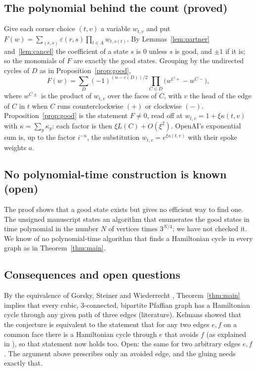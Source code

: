\documentclass[10pt]{amsart}
\numberwithin{equation}{section}
\theoremstyle{definition}
\theoremstyle{remark}
\newcommand{\eps}{\varepsilon}
\begin{document}
\subsection*{The polynomial behind the count (proved)}
Give each corner choice $(t,v)$ a variable $w_{t,v}$ and put $F(w)=\sum_{(r,s)}\eps(r,s)\prod_{t\in A}w_{t,s(t)}$.
By Lemmas~\ref{lem:partner} and~\ref{lem:cancel} the coefficient of a state $s$ is $0$ unless $s$ is good, and $\pm1$ if it is; so the monomials of $F$ are exactly the good states.
Grouping by the undirected cycles of $D$ as in Proposition~\ref{prop:good},
\[
F(w)=\sum_{D}(-1)^{(n-c(D))/2}\prod_{C\in D}\bigl(w^{C+}-w^{C-}\bigr),
\]
where $w^{C\pm}$ is the product of $w_{t,v}$ over the faces of $C$, with $v$ the head of the edge of $C$ in $t$ when $C$ runs counterclockwise $(+)$ or clockwise $(-)$.
Proposition~\ref{prop:good} is the statement $F\neq0$, read off at $w_{t,v}=1+\xi\kappa(t,v)$ with $\kappa=\sum_y\kappa_y$: each factor is then $\xi L(C)+O(\xi^2)$.
OpenAI's exponential sum is, up to the factor $i^{-n}$, the substitution $w_{t,v}=e^{\xi a(t,v)}$ with their spoke weights $a$.

\subsection*{No polynomial-time construction is known (open)}
The proof shows that a good state exists but gives no efficient way to find one.
The unsigned manuscript \cite{constructive2026} states an algorithm that enumerates the good states in time polynomial in the number $N$ of vertices times $3^{N/4}$; we have not checked it.
We know of no polynomial-time algorithm that finds a Hamiltonian cycle in every graph as in Theorem~\ref{thm:main}.

\subsection*{Consequences and open questions}
By the equivalence of Gorsky, Steiner and Wiederrecht \cite[Theorem~4.16]{gsw2023}, Theorem~\ref{thm:main} implies that every cubic, $3$-connected, bipartite Pfaffian graph has a Hamiltonian cycle through any given path of three edges \cite[Corollary~7.2]{openai2026} (literature).
Kelmans showed that the conjecture is equivalent to the statement that for any two edges $e,f$ on a common face there is a Hamiltonian cycle through $e$ that avoids $f$ (as explained in \cite{hertel2005,apsw2016}), so that statement now holds too.
Open: the same for two arbitrary edges $e,f$.
The argument above prescribes only an avoided edge, and the gluing needs exactly that.



\end{document}
